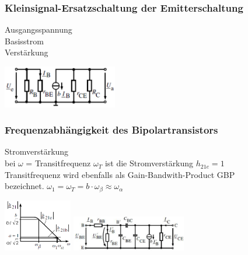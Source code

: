   \subsubsection{Kleinsignal-Ersatzschaltung der Emitterschaltung}
    \begin{minipage}[T]{14cm}
      Ausgangsspannung
      \hspace{13mm}\\
      Basisstrom
      \hspace{25.3mm}\\
      Verst\"arkung
      \hspace{23.3mm}\\
    \end{minipage}
    \begin{minipage}[T]{5cm}
      \includegraphics[width=5cm]{./bilder/KleinSigErsEmmitersch.png}
    \end{minipage}
            
    \subsubsection{Frequenzabh\"angigkeit des Bipolartransistors}
      \begin{minipage}[T]{11cm}
        Stromverst\"arkung
        \hspace{14.5mm}\\
        bei $\omega$ = Transitfrequenz $\omega_T$ ist die Stromverst\"arkung $h_{21e} = 1$\\
        Transitfrequenz wird ebenfalls als Gain-Bandwith-Product GBP\\bezeichnet.
        $\omega_1 = \omega_T = b\cdot \omega_{\beta} \approx \omega_{\alpha}$
      \end{minipage}
      \begin{minipage}[T]{8cm}
        \includegraphics[width=3cm]{./bilder/BipTraFrequenzgang.png}
        \includegraphics[width=5cm]{./bilder/BipTraErsatzschFreq.png}
      \end{minipage}
            
